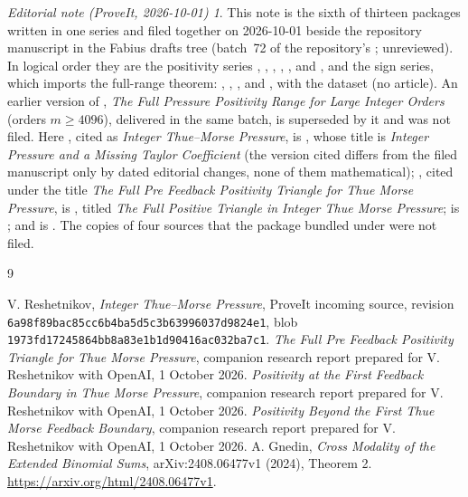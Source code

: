 \documentclass[11pt,a4paper]{article}
\theoremstyle{remark}\newtheorem*{ednote}{Editorial note (ProveIt, 2026-10-01)}
\begin{document}
\begin{ednote}
This note is the sixth of thirteen packages written in one series and filed together on 2026-10-01 beside the repository manuscript  in the Fabius drafts tree (batch~72 of the repository's ; unreviewed). In logical order they are the positivity series , , , , ,  and , and the sign series, which imports the full-range theorem: , , ,  and , with the dataset  (no article). An earlier version of , \emph{The Full Pressure Positivity Range for Large Integer Orders} (orders $m\ge4096$), delivered in the same batch, is superseded by it and was not filed.
Here \cite{integer}, cited as \emph{Integer Thue--Morse Pressure}, is , whose title
is \emph{Integer Pressure and a Missing Taylor Coefficient} (the version cited differs from the filed manuscript only by dated editorial changes, none of them mathematical); \cite{triangle},
cited under the title \emph{The Full Pre Feedback Positivity Triangle for Thue Morse Pressure},
is , titled \emph{The Full Positive Triangle in Integer Thue Morse
Pressure}; \cite{boundary} is ; and \cite{offset} is
. The copies of four sources that the package bundled under
 were not filed.
\end{ednote}
\begin{thebibliography}{9}\small\raggedright
{} V. Reshetnikov, \emph{Integer Thue--Morse Pressure}, ProveIt incoming source, revision \texttt{6a98f89bac85cc6b4ba5d5c3b63996037d9824e1}, blob \texttt{1973fd17245864bb8a83e1b1d90416ac032ba7c1}.
 \emph{The Full Pre Feedback Positivity Triangle for Thue Morse Pressure}, companion research report prepared for V. Reshetnikov with OpenAI, 1 October 2026.
 \emph{Positivity at the First Feedback Boundary in Thue Morse Pressure}, companion research report prepared for V. Reshetnikov with OpenAI, 1 October 2026.
 \emph{Positivity Beyond the First Thue Morse Feedback Boundary}, companion research report prepared for V. Reshetnikov with OpenAI, 1 October 2026.
 A. Gnedin, \emph{Cross Modality of the Extended Binomial Sums}, arXiv:2408.06477v1 (2024), Theorem 2. \url{https://arxiv.org/html/2408.06477v1}.
\end{thebibliography}
\end{document}
